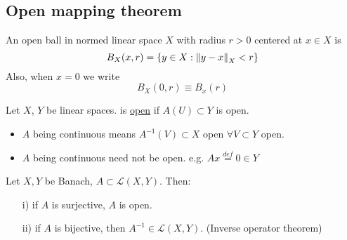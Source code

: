 \begin{comment}
\end{corollary}

\begin{example}[???]\nl
	A is surjective: for $g\in C$ define $f(t)=\int_0^t g(s) ds$. Then by FTC, $Af=g$.\\
	A is not injective: $Af=A\tilde{f}\implies f=\tilde{f}+c,c\in\real$. 
	Let $D(A)\defeq C_0^1[0,1]=\{f\in C^1[0,1]:f(0)=0\}$
	Then $A:D(A)\to C$ is bijective and has continuous inverse $B=A^{-1}$ by corollary. In fact, $Bf(t)=\int_0^tf(s)ds$ with $Bf\in D(A)$.
\end{example}

\end{comment}


\subsection{Open mapping theorem}
\begin{definition}\nl
An open ball in normed linear space $X$ with radius $r>0$ centered at $x\in X$ is
$$
B_X(x,r)=\{y\in X:\left\|{y-x}\right\|_X<r\}
$$
Also, when $x=0$ we write 
$$
B_X(0,r)\equiv B_x(r)
$$
\end{definition}

\begin{definition}\label{open map}\nl
	Let $X$, $Y$ be linear spaces.  is {\underline{open}} if $A(U)\subset Y $ is open.
\end{definition}
\begin{remark}\hfill

\begin{itemize}
    \item $A$ being continuous means $A^{-1}(V)\subset{X}$ open $\forall V\subset Y$ open.
    \item $A$ being continuous need not be open. e.g. $Ax\stackrel{def}{=}0\in Y$
\end{itemize}
\end{remark}

\begin{theorem}\label{OMT}\nl
	Let $X,Y$ be Banach, $A\subset\mathcal{L}(X,Y)$. Then:
	\begin{itemize}
	    \item[i)] if $A$ is surjective, $A$ is open.
	    \item[ii)] if $A$ is bijective, then $A^{-1}\in \mathcal{L}(X,Y)$. (Inverse operator theorem)
	\end{itemize}
\end{theorem}

